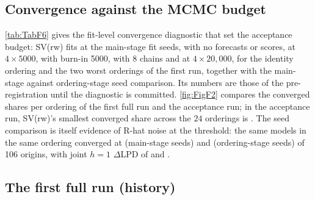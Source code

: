 \subsection{Convergence against the MCMC budget}\label{app:cr-budget}

\cref{tab:TabF6} gives the fit-level convergence diagnostic that set the acceptance budget: SV(rw)
fits at the main-stage fit seeds, with no forecasts or scores, at $4\times5000$, with burn-in 5000,
with 8 chains and at $4\times20{,}000$, for the identity ordering and the two worst orderings of the
first run, together with the main-stage against ordering-stage seed comparison.
Its numbers are those of the pre-registration until the diagnostic is committed.
\cref{fig:FigF2} compares the converged shares per ordering of the first full run and the
acceptance run; in the acceptance run, SV(rw)'s smallest converged share across the $24$ orderings
is . %
The seed comparison is itself evidence of R-hat noise at the threshold: the same models in the same
ordering converged at  (main-stage seeds) and  (ordering-stage seeds) of 106
origins, with joint $h = 1$ $\Delta$LPD of  and .

\begin{table}[!htbp]
\centering\small
\caption{Convergence against the MCMC budget for SV(rw), fit-level only: $4\times5000$, burn-in
5000, 8 chains and $4\times20{,}000$; identity ordering and the two worst orderings; converged
origins, maximum R-hat and minimum bulk ESS; and the main-stage against ordering-stage seed
comparison.}
\label{tab:TabF6}

\end{table}

\subsection{The first full run (history)}\label{app:cr-first-run}

